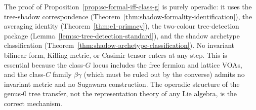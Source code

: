 \begin{remark}
\label{rem:sc-formal-no-metric}
The proof of
Proposition~\ref{prop:sc-formal-iff-class-g} is purely
operadic: it uses the tree-shadow correspondence
\textup{(}Theorem~\ref{thm:shadow-formality-identification}\textup{)},
the averaging identity
\textup{(}Theorem~\ref{thm:e1-primacy}\textup{)}, the two-colour
tree-detection package
\textup{(}Lemma~\ref{lem:sc-tree-detection-standard}\textup{)}, and
the shadow archetype classification
\textup{(}Theorem~\ref{thm:shadow-archetype-classification}\textup{)}.
No invariant bilinear form, Killing metric, or Casimir tensor
enters at any step. This is essential because the class-$G$ locus
includes the free fermion and lattice VOAs, and the class-$C$
family $\beta\gamma$ (which must be ruled out by the converse)
admits no invariant metric and no Sugawara construction.
The operadic structure of the genus-$0$ tree transfer, not the
representation theory of any Lie algebra, is the correct
mechanism.
\end{remark}

